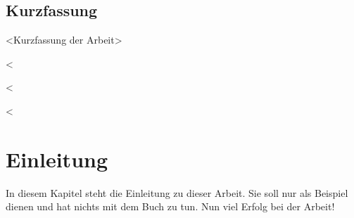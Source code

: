 \documentclass[runningheads,a4paper,ngerman]{llncs}[2022/01/12]
\begin{document}
\pagestyle{preamble}
\renewcommand*{\chapterpagestyle}{preamble}

\section*{Kurzfassung}

<Kurzfassung der Arbeit>

\cleardoublepage


%
%
\tableofcontents

\listoffigures

\listoftables
<%

\lstlistoflistings
<%

<%


\printnoidxglossaries


\renewcommand*{\chapterpagestyle}{scrplain}
\pagestyle{scrheadings}
\pagestyle{scrheadings}
\ihead[]{}
\chead[]{}
\ohead[]{\headmark}
\cfoot[]{}
\ifoot[]{}

\chapter{Einleitung}
In diesem Kapitel steht die Einleitung zu dieser Arbeit.
Sie soll nur als Beispiel dienen und hat nichts mit dem Buch \cite{WSPA} zu tun.
Nun viel Erfolg bei der Arbeit!
\end{document}
